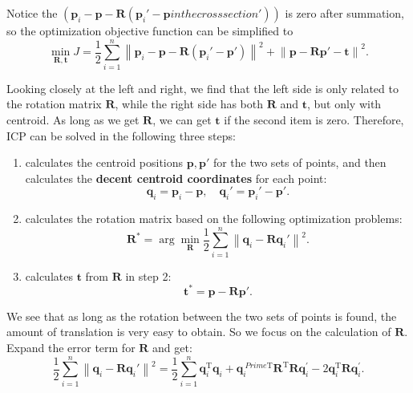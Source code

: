 Notice the $\left( {{\bm{p}_i} - \bm{p} - \bm{R}\left( {{\bm{p}_i}' - \bm{p} in the cross section '} \right)} \right)$ is zero after summation, so the optimization objective function can be simplified to
\begin{equation}
\mathop {\min }\limits_{\bm{R}, \bm{t}} J = \frac{1}{2}\sum\limits_{i = 1}^n {{\left\| {{ \bm{p}_i} - \bm{p} - \bm{R}\left( {{\bm{p}_i}' - \bm{p}'} \right)} \right\|}^ 2} + {{\left\| {\bm{p} - \bm{Rp}' - \bm{t}} \right\|}^2} .
\end{equation}

Looking closely at the left and right, we find that the left side is only related to the rotation matrix $\bm{R}$, while the right side has both $\bm{R}$ and $\bm{t}$, but only with centroid. As long as we get $\bm{R}$, we can get $\bm{t}$ if the second item is zero. Therefore, ICP can be solved in the following three steps:

\begin{mdframed}
\begin{enumerate}
\item calculates the centroid positions $\bm{p}, \bm{p}'$ for the two sets of points, and then calculates the \textbf{decent centroid coordinates} for each point:
\[
\bm{q}_i = \bm{p}_i - \bm{p}, \quad \bm{q}_i' = \bm{p}_i' - \bm{p}'.
\]
\item calculates the rotation matrix based on the following optimization problems:
\begin{equation}
\bm{R}^* = \arg \mathop {\min }\limits_{\bm{R}} \frac{1}{2}\sum\limits_{i = 1}^n {{\left\| {{\bm{q}_i} - \bm{R} \bm{q}_i' } \right\|}^2}.
\end{equation}
\item calculates $\bm{t}$ from $\bm{R}$ in step 2:
\begin{equation}
\label{eq:pnp-solve-t}
\bm{t}^* = \bm{p} - \bm{R} \bm{p}'.
\end{equation}
\end{enumerate}
\end{mdframed}
	
We see that as long as the rotation between the two sets of points is found, the amount of translation is very easy to obtain. So we focus on the calculation of $\bm{R}$. Expand the error term for $\bm{R}$ and get:
\begin{equation}
 \frac{1}{2}\sum\limits_{i = 1}^n \left\| {{\bm{q}_i} - \bm{R} \bm{q}_i' } \right\| ^2 = \frac{1}{2}\sum\limits_{i = 1}^n \bm{q}_i^\mathrm{T} \bm{q}_i + \bm{q}_i^{ \ Prime \mathrm{T}} \bm{R}^\mathrm{T} \bm{R} \bm{q}^\prime_i - 2\bm{q}_i^\mathrm{T} \bm{R} \bm{q}^\prime_i.
\end{equation}

